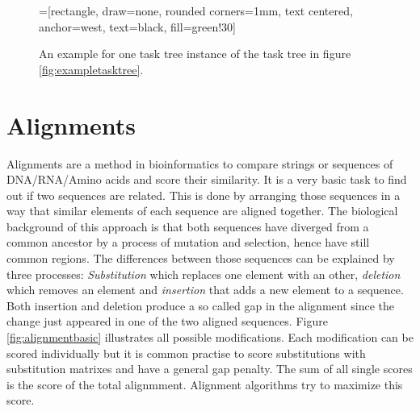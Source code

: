 	\begin{figure}
		=[rectangle, draw=none, rounded corners=1mm,
		        text centered, anchor=west, text=black, fill=green!30]
		
		\label{fig:exampletaskinstancetree}
		\caption{An example for one task tree instance of the task tree in figure \ref{fig:exampletasktree}\cite{harms2013}.}
	\end{figure}
\section{Alignments}
Alignments are a method in bioinformatics to compare strings or sequences of DNA/RNA/Amino acids and score their similarity. 
It is a very basic task to find out if two sequences are related. 
This is done by arranging those sequences in a way that similar elements of each sequence are aligned together. The biological background of this approach is that
both sequences have diverged from a common ancestor by a process of mutation and selection\cite{durbin1998}, hence have still common regions. The differences between those
sequences can be explained by three processes: \textit{Substitution} which replaces one element with an other,  \textit{deletion} which removes an element and \textit{insertion} that adds a new element to a sequence.
Both insertion and deletion produce a so called gap in the alignment since the change just appeared in one of the two aligned sequences. Figure \ref{fig:alignmentbasic} illustrates all possible modifications.
Each modification can be scored individually but it is common practise to score substitutions with substitution matrixes and have a general gap penalty. The sum of all single scores is the score of the total alignmment.
Alignment algorithms try to maximize this score.

